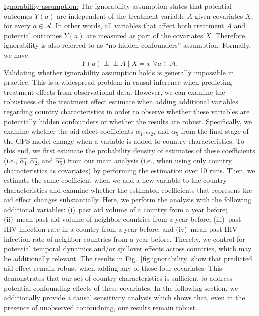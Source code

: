 \documentclass[sigconf]{acmart}
\begin{document}
\newpage 

\noindent
\underline{Ignorability assumption:} The ignorability assumption states that potential outcomes $Y(a)$ are independent of the treatment variable $A$ given covariates $X$, for every $a \in \mathcal{A}$. In other words, all variables that affect both treatment $A$ and potential outcomes $Y(a)$ are measured as part of the covariates $X$. Therefore, ignorability is also referred to as ``no hidden confounders'' assumption. Formally, we have 
\begin{equation*}
    Y(a) \perp \!\!\! \perp A \mid X = x \, \, \forall a \in \mathcal{A} .
\end{equation*}
Validating whether ignorability assumption holds is generally impossible in practice. This is a widespread problem in causal inference when predicting treatment effects from observational data. However, we can examine the robustness of the treatment effect estimate when adding additional variables regarding country characteristics in order to observe whether these variables are potentially hidden confounders or whether the results are robust. Specifically, we examine whether the aid effect coefficients $\alpha_1, \alpha_2$, and $\alpha_5$ from the final stage of the GPS model change when a variable is added to country characteristics. To this end, we first estimate the probability density of estimates of these coefficients (i.e., $\hat{\alpha_1}, \hat{\alpha_2}$, and $\hat{\alpha_5}$) from our main analysis (i.e., when using only country characteristics as covariates) by performing the estimation over 10 runs. Then, we estimate the same coefficient when we add a new variable to the country characteristics and examine whether the estimated coefficients that represent the aid effect changes substantially. Here, we perform the analysis with the following additional variables: (i)~past aid volume of a country from a year before; (ii)~mean past aid volume of neighbor countries from a year before; (iii)~past HIV infection rate in a country from a year before; and (iv)~mean past HIV infection rate of neighbor countries from a year before. Thereby, we control for potential temporal dynamics and/or spillover effects across countries, which may be additionally relevant. The results in Fig.~\ref{fig:ignorability} show that predicted aid effect remain robust when adding any of these four covariates. This demonstrates that our set of country characteristics is sufficient to address potential confounding effects of these covariates. In the following section, we additionally provide a causal sensitivity analysis which shows that, even in the presence of unobserved confoudning, our results remain robust.  
\end{document}
